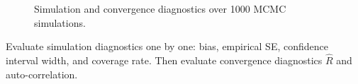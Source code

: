 \documentclass[article]{jss}
\begin{document}
\begin{figure}[h]
  \caption{Simulation and convergence diagnostics over 1000 MCMC simulations.}
    \label{fig:ac}
\end{figure}

Evaluate simulation diagnostics one by one: bias, empirical SE, confidence interval width, and coverage rate. Then evaluate convergence diagnostics $\widehat{R}$ and auto-correlation.
\end{document}

